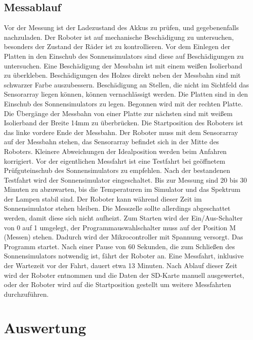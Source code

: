 \documentclass[a4paper,bibtotoc,oneside]{scrbook}
\begin{document}
\subsection{Messablauf}\thispagestyle{empty}
Vor der Messung ist der Ladezustand des Akkus zu prüfen, und gegebenenfalls nachzuladen. Der Roboter ist auf mechanische Beschädigung zu untersuchen, besonders der Zustand der Räder ist zu kontrollieren.
Vor dem Einlegen der Platten in den Einschub des Sonnensimulators sind diese auf Beschädigungen zu untersuchen. Eine Beschädigung der Messbahn ist mit einem weißen Isolierband zu überkleben. Beschädigungen des Holzes direkt neben der Messbahn sind mit schwarzer Farbe auszubessern. Beschädigung an Stellen, die nicht im Sichtfeld das Sensorarray liegen können, können vernachlässigt werden.
Die Platten sind in den Einschub des Sonnensimulators zu legen. Begonnen wird mit der rechten Platte. Die Übergänge der Messbahn von einer Platte zur nächsten sind mit weißem Isolierband  der Breite 14mm zu überbrücken. 
Die Startposition des Roboters ist das linke vordere Ende der Messbahn. Der Roboter muss mit dem Sensorarray auf der Messbahn stehen, das Sensorarray befindet sich in der Mitte des Roboters. Kleinere Abweichungen der Idealposition werden beim Anfahren korrigiert. 
Vor der eigentlichen Messfahrt ist eine Testfahrt bei geöffnetem Prüfguteinschub des Sonnensimulators zu empfehlen. 
Nach der bestandenen Testfahrt wird der Sonnensimulator eingeschaltet. Bis zur Messung sind 20 bis 30 Minuten zu abzuwarten, bis die Temperaturen im Simulator und das Spektrum der Lampen stabil sind. Der Roboter kann während dieser Zeit im Sonnensimulator stehen bleiben. Die Messzelle sollte allerdings abgeschattet werden, damit diese sich nicht aufheizt. 
Zum Starten wird der Ein/Aus-Schalter von 0 auf 1 umgelegt, der Programmauswahlschalter muss auf der Position M (Messen) stehen. Dadurch wird der Mikrocontroller mit Spannung versorgt. Das Programm startet. Nach einer Pause von 60 Sekunden, die zum Schließen des Sonnensimulators notwendig ist, fährt der Roboter an. Eine Messfahrt, inklusive der Wartezeit vor der Fahrt, dauert etwa 13 Minuten. Nach Ablauf dieser Zeit wird der Roboter entnommen und die Daten der SD-Karte manuell ausgewertet, oder der Roboter wird auf die Startposition gestellt um weitere Messfahrten durchzuführen.


\section{Auswertung}\thispagestyle{empty}
\end{document}
